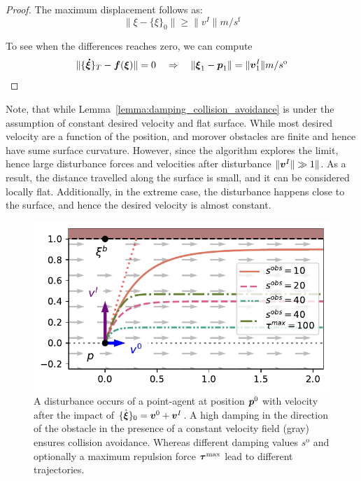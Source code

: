 \begin{proof}
The maximum displacement follows as:
\begin{equation}
	\| {\xi} - \{\xi \}_0 \| \geq \| v^I \| {m} / {s^{\mathrm{f}}} 
\end{equation}

To see when the differences reaches zero, we can compute
\begin{equation}
 \|	\{ \boldsymbol{\dot \xi} \}_T - \boldsymbol{f}(\boldsymbol{\xi}) \| = 0
 \quad \Rightarrow \quad
    \| \boldsymbol{\xi}_1 -  \boldsymbol{p}_1 \| = \| \boldsymbol{v}^I_1 \| {m} / {s^{\mathrm{o}}} 
 \end{equation}
\end{proof}

Note, that while Lemma~\ref{lemma:damping_collision_avoidance} is under the assumption of constant desired velocity and flat surface. While most desired velocity are a function of the position, and morover obstacles are finite and hence have sume surface curvature. However, since the algorithm explores the limit, hence large disturbance forces and velocities after disturbance $\| \boldsymbol{v}^I \| \gg 1 \|$. As a result, the distance travelled along the surface is small, and it can be considered locally flat. Additionally, in the extreme case, the disturbance happens close to the surface, and hence the desired velocity is almost constant.  

\begin{figure}[htb]
\centering
  \centerline{\includegraphics[width=0.99\columnwidth]{figures/parallel_avoidance_obstacle}}
  \caption{A disturbance occurs of a point-agent at position $\boldsymbol{p}^0$ with velocity after the impact of $\{ \dot{\boldsymbol{\xi}} \}_0 = \boldsymbol{v}^0 + \boldsymbol{v}^I$. A high damping in the direction of the obstacle in the presence of a constant velocity field (gray) ensures collision avoidance. Whereas different damping values $s^{\mathrm{o}}$ and optionally a maximum repulsion force $\boldsymbol{\tau}^{\mathrm{max}}$ lead to different trajectories.}
  \label{fig:disturbance_with_parallel_velocity}
\end{figure}
    

